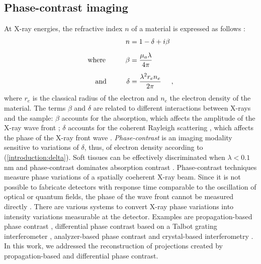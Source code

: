 {\subsection{Phase-contrast imaging}
\label{introduction:phase-contrast-imaging}
At X-ray energies, the refractive index $n$ of a material is expressed as follows \cite{Nielsen2011}:
\begin{align}
  n &= 1 - \delta + i\beta \label{introduction:refractive-index}\\[0.5em]
  \text{where}\hspace*{1.0cm}\beta &= \frac{\mu_{a}\lambda}{4\pi} \label{introduction:beta}\\[0.5em]
  \text{and}\hspace*{1.0cm}\delta &= \frac{\lambda^{2}r_{e}n_{e}}{2\pi}\hspace*{0.5cm}, \label{introduction:delta} 
\end{align}
where $r_{e}$ is the classical radius of the electron and $n_{e}$ the electron density of the material. 
The terms $\beta$ and $\delta$ are related to different interactions between X-rays and the sample: $\beta$ accounts for the absorption, which affects the amplitude of the X-ray wave front \cite{Veen2004};
$\delta$ accounts for the coherent Rayleigh scattering \cite{Nielsen2011}, which affects the phase of the X-ray front wave \cite{Veen2004}.
\newline
\textit{Phase-contrast} is an imaging modality sensitive to variations of $\delta$, thus, of electron density according to (\ref{introduction:delta}).
Soft tissues can be effectively discriminated when $\lambda < 0.1$ nm and
phase-contrast dominates absorption contrast \cite{Nielsen2011,Veen2004}.
Phase-contrast techniques measure phase variations of a spatially coeherent X-ray beam.
Since it is not possible to fabricate detectors with response time comparable to the oscillation of optical or quantum fields,
the phase of the wave front cannot be measured directly \cite{Modregger2012}.
There are various systems to convert X-ray phase variations into
intensity variations measurable at the detector. Examples are propagation-based phase contrast \cite{Snigirev1995,Wilkins1996}, 
differential phase contrast based on a Talbot grating interferometer \cite{David2002}, analyzer-based phase contrast \cite{Davis1995} and crystal-based interferometry \cite{Momose1996}.
\newline
In this work, we addressed the reconstruction of projections created by propagation-based and differential phase contrast.


}
